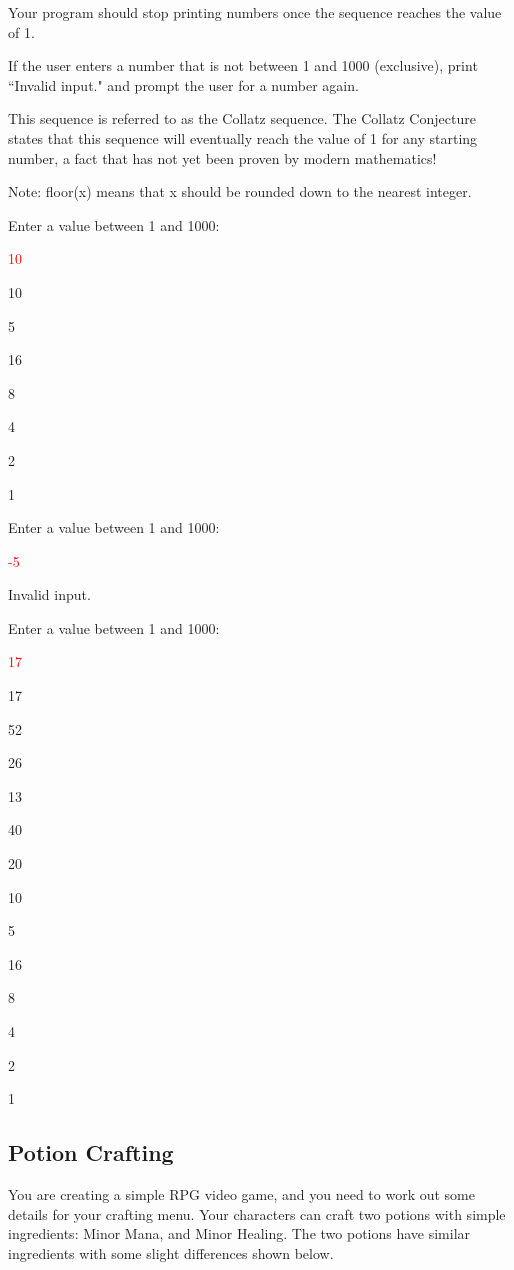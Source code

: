 Your program should stop printing numbers once the sequence reaches the value of 1.

If the user enters a number that is not between 1 and 1000 (exclusive), print ``Invalid input." and prompt the user for a number again.

This sequence is referred to as the Collatz sequence. The Collatz Conjecture states that this sequence will eventually reach the value of 1 for any starting number, a fact that has not yet been proven by modern mathematics!

Note: floor(x) means that x should be rounded down to the nearest integer.

\begin{sample}
    Enter a value between 1 and 1000:
    
\textcolor{red}{10}

10

5

16

8

4

2

1
\end{sample}

\begin{sample}
Enter a value between 1 and 1000:

\textcolor{red}{-5}

Invalid input.

Enter a value between 1 and 1000:

\textcolor{red}{17}

17

52

26

13

40

20

10

5

16

8

4

2

1
\end{sample}

\subsection{Potion Crafting}
You are creating a simple RPG video game, and you need to work out some details for your crafting menu. Your characters can craft two potions with simple ingredients: Minor Mana, and Minor Healing. The two potions have similar ingredients with some slight differences shown below.

